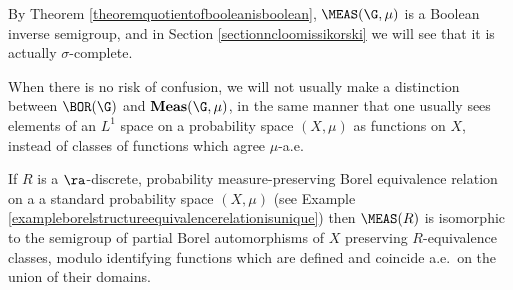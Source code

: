 By Theorem \ref{theoremquotientofbooleanisboolean}, $\MEAS(\G,\mu)$ is a Boolean inverse semigroup, and in Section \ref{sectionncloomissikorski} we will see that it is actually $\sigma$-complete.

When there is no risk of confusion, we will not usually make a distinction between $\BOR(\G)$ and $\mathbf{Meas}(\G,\mu)$, in the same manner that one usually sees elements of an $L^1$ space on a probability space $(X,\mu)$ as functions on $X$, instead of classes of functions which agree $\mu$-a.e.

\begin{example}\label{exampleinterpretationofmeasr}
If $R$ is a $\ra$-discrete, probability measure-preserving Borel equivalence relation on a a standard probability space $(X,\mu)$ (see Example \ref{exampleborelstructureequivalencerelationisunique}) then $\MEAS(R)$ is isomorphic to the semigroup of partial Borel automorphisms of $X$ preserving $R$-equivalence classes, modulo identifying functions which are defined and coincide a.e.\ on the union of their domains.
\end{example}


%